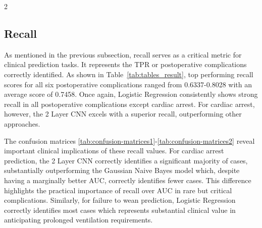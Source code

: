 \documentclass[bst/sn-nature]{sn-jnl}
\begin{document}
\begin{multicols}{2}
\subsection{Recall}

\quad As mentioned in the previous subsection, recall serves as a critical metric for clinical prediction tasks. It represents the TPR or postoperative complications correctly identified. As shown in Table~\ref{tab:tables_result}, top performing recall scores for all six postoperative complications ranged from 0.6337-0.8028 with an average score of 0.7458. Once again, Logistic Regression consistently shows strong recall in all postoperative complications except cardiac arrest. For cardiac arrest, however, the 2 Layer CNN excels with a superior recall, outperforming other approaches.

The confusion matrices \ref{tab:confusion-matrices1}-\ref{tab:confusion-matrices2} reveal important clinical implications of these recall values. For cardiac arrest prediction, the 2 Layer CNN correctly identifies a significant majority of cases, substantially outperforming the Gaussian Naive Bayes model which, despite having a marginally better AUC, correctly identifies fewer cases. This difference highlights the practical importance of recall over AUC in rare but critical complications. Similarly, for failure to wean prediction, Logistic Regression correctly identifies most cases which represents substantial clinical value in anticipating prolonged ventilation requirements.


\end{multicols}
\end{document}
